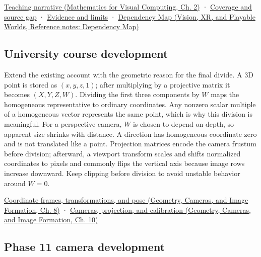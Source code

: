\href{../02-Mathematics-for-Visual-Computing/main.pdf\#nameddest=01-foundations-i-ch018-homogeneous-coordinates-preserve-the-role-of-a-location}{Teaching narrative (Mathematics for Visual Computing, Ch. 2)} · \hyperref[appendix-fd090d982a15-phase-6---parts-501-600]{Coverage and source gap} · \hyperref[appendix-a103e7846d21-phase-6---source-analysis-and-verification]{Evidence and limits} · \href{../07-Vision-XR-and-Playable-Worlds/main.pdf\#nameddest=appendix-4ad47bdd269a}{Dependency Map (Vision, XR, and Playable Worlds, Reference notes: Dependency Map)}

\subsection{University course development}\label{appendix-cb3b26862282-university-course-development}

Extend the existing account with the geometric reason for the final divide. A 3D point is stored as \((x,y,z,1)\); after multiplying by a projective matrix it becomes \((X,Y,Z,W)\). Dividing the first three components by \(W\) maps the homogeneous representative to ordinary coordinates. Any nonzero scalar multiple of a homogeneous vector represents the same point, which is why this division is meaningful. For a perspective camera, \(W\) is chosen to depend on depth, so apparent size shrinks with distance. A direction has homogeneous coordinate zero and is not translated like a point. Projection matrices encode the camera frustum before division; afterward, a viewport transform scales and shifts normalized coordinates to pixels and commonly flips the vertical axis because image rows increase downward. Keep clipping before division to avoid unstable behavior around \(W=0\).

\href{../03-Geometry-Cameras-and-Image-Formation/main.pdf\#nameddest=03-visual-computing-i-ch001-coordinate-frames-transformations-and-pose}{Coordinate frames, transformations, and pose (Geometry, Cameras, and Image Formation, Ch. 8)} · \href{../03-Geometry-Cameras-and-Image-Formation/main.pdf\#nameddest=03-visual-computing-i-ch003-cameras-projection-and-calibration}{Cameras, projection, and calibration (Geometry, Cameras, and Image Formation, Ch. 10)}

\subsection{Phase 11 camera development}\label{appendix-cb3b26862282-phase-11-camera-development}

